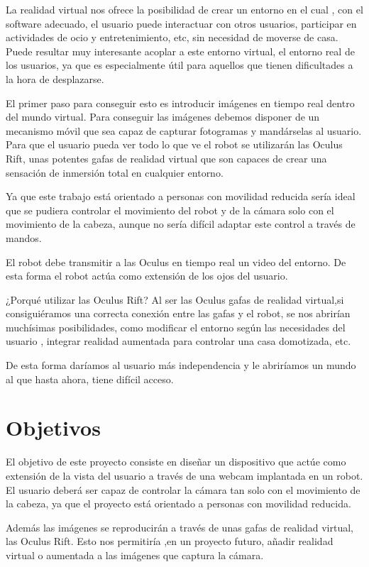 \documentclass[twoside, 12pt]{epstfg}
\begin{document}
La realidad virtual nos ofrece la posibilidad de crear un entorno en el cual , con el software adecuado, el usuario puede interactuar con otros usuarios, participar en actividades de ocio y entretenimiento, etc, sin necesidad de moverse de casa.
Puede resultar muy interesante acoplar a este entorno virtual, el entorno real de los usuarios, ya que es especialmente útil para aquellos que tienen dificultades a la hora de desplazarse.

El primer paso para conseguir esto es introducir imágenes en tiempo real dentro del mundo virtual. Para conseguir las imágenes debemos disponer de un mecanismo móvil que sea capaz de capturar fotogramas y mandárselas al usuario.  
Para que el usuario pueda ver todo lo que ve el robot se utilizarán las Oculus Rift, unas potentes gafas de realidad virtual que son capaces de crear una sensación de inmersión total en cualquier entorno.

Ya que este trabajo está orientado a personas con movilidad reducida sería ideal que se pudiera controlar el movimiento del robot y de la cámara solo con el movimiento de la cabeza, aunque no sería difícil adaptar este control a través de mandos.

El robot debe transmitir a las Oculus en tiempo real un video del entorno. De esta forma el robot actúa como extensión de los ojos del usuario.

¿Porqué utilizar las Oculus Rift?  Al ser las Oculus gafas de realidad virtual,si consiguiéramos una correcta conexión entre las gafas y el robot, se nos abrirían muchísimas posibilidades, como modificar el entorno según las necesidades del usuario , integrar realidad aumentada para controlar una casa domotizada, etc.

De esta forma daríamos al usuario más independencia y le abriríamos un mundo al que hasta ahora, tiene difícil acceso.

\newpage
\section{Objetivos}
El objetivo de este proyecto consiste en diseñar un dispositivo que actúe como extensión de la vista del usuario a través de una webcam implantada en un robot. El usuario deberá ser capaz de controlar la cámara tan solo con el movimiento de la cabeza, ya que el proyecto está orientado a personas con movilidad reducida.

Además las imágenes se reproducirán a través de unas gafas de realidad virtual, las Oculus Rift. Esto nos permitiría ,en un proyecto futuro, añadir realidad virtual o aumentada a las imágenes que captura la cámara.
\end{document}

